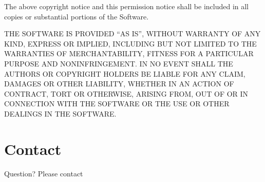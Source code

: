 \documentclass[letterpaper,10pt,english]{sphinxmanual}
\begin{document}
The above copyright notice and this permission notice shall be included in all copies or substantial portions of the Software.

THE SOFTWARE IS PROVIDED “AS IS”, WITHOUT WARRANTY OF ANY KIND, EXPRESS OR IMPLIED, INCLUDING BUT NOT LIMITED TO THE WARRANTIES OF MERCHANTABILITY, FITNESS FOR A PARTICULAR PURPOSE AND NONINFRINGEMENT. IN NO EVENT SHALL THE AUTHORS OR COPYRIGHT HOLDERS BE LIABLE FOR ANY CLAIM, DAMAGES OR OTHER LIABILITY, WHETHER IN AN ACTION OF CONTRACT, TORT OR OTHERWISE, ARISING FROM, OUT OF OR IN CONNECTION WITH THE SOFTWARE OR THE USE OR OTHER DEALINGS IN THE SOFTWARE.


\section{Contact}
\label{\detokenize{license:contact}}
Question? Please contact 



\renewcommand{\indexname}{Index}
\printindex
\end{document}
